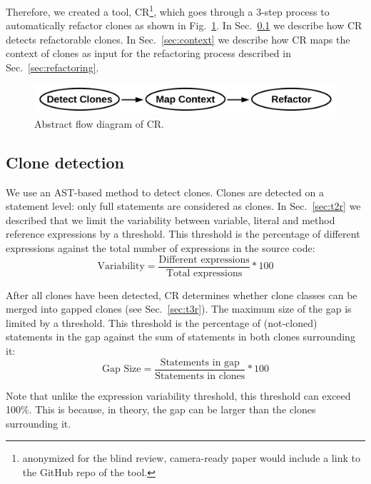 \documentclass[sigconf,review,anonymous]{acmart}
\begin{document}
Therefore, we created a tool, CR\footnote{anonymized for the blind review, camera-ready paper would include a link to the GitHub repo of the tool.}, which goes through a 3-step process to automatically refactor clones as shown in Fig.~\ref{fig:clonerefactorflow}. In Sec.~\ref{sec:detection} we describe how CR detects refactorable clones. In Sec.~\ref{sec:context} we describe how CR maps the context of clones as input for the refactoring process described in Sec.~\ref{sec:refactoring}.

\begin{figure}[H]
  \includegraphics[width=0.7\columnwidth]{img/flow}
  \caption{Abstract flow diagram of CR.}
  \label{fig:clonerefactorflow}
\end{figure}

\subsection{Clone detection}\label{sec:detection}
We use an AST-based method to detect clones. Clones are detected on a statement level: only full statements are considered as clones. In Sec.~\ref{sec:t2r} we described that we limit the variability between variable, literal and method reference expressions by a threshold. This threshold is the percentage of different expressions against the total number of expressions in the source code:
\begin{equation}\label{eq:type2r}
\text{Variability}=\frac{\text{Different expressions}}{\text{Total expressions}}*100
\end{equation}

After all clones have been detected, CR determines whether clone classes can be merged into gapped clones (see Sec.~\ref{sec:t3r}). The maximum size of the gap is limited by a threshold. This threshold is the percentage of (not-cloned) statements in the gap against the sum of statements in both clones surrounding it:
\begin{equation}\label{eq:type3r}
\text{Gap Size}=\frac{\text{Statements in gap}}{\text{Statements in clones}}*100
\end{equation}

Note that unlike the expression variability threshold, this threshold can exceed 100\%. This is because, in theory, the gap can be larger than the clones surrounding it.
\end{document}
